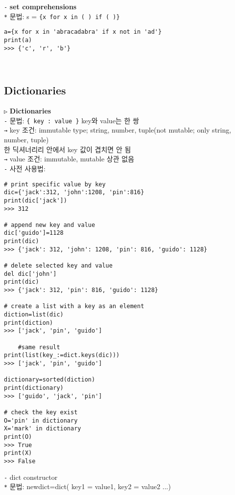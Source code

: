 \documentclass[11pt,a4paper]{article}
\begin{document}
\texttt{-} \textbf{set comprehensions}\\
\hspace*{2em}\texttt{*} 문법: s = \verb|{x for x in ( ) if ( )}|
\begin{lstlisting}[label={list:first}]
a={x for x in 'abracadabra' if x not in 'ad'}
print(a)
>>> {'c', 'r', 'b'}
\end{lstlisting}\\

\subsection{\Large\textbf{Dictionaries}}
\begin{spacing}{1.5}
\texttt{▷} \textbf{Dictionaries}\\
\texttt{-} 문법: \verb|{ key : value }| key와 value는 한 쌍\\
\hspace*{3em}\texttt{→} key 조건: immutable type; string, number, tuple(not mutable; only string, number, tuple)\\
\hspace*{5em}한 딕셔너리리 안에서 key 값이 겹치면 안 됨\\
\hspace*{3em}\texttt{→} value 조건: immutable, mutable 상관 없음\\
\texttt{-} 사전 사용법:
\end{spacing}
\begin{lstlisting}[label={list:first}]
# print specific value by key
dic={'jack':312, 'john':1208, 'pin':816}
print(dic['jack'])
>>> 312

# append new key and value
dic['guido']=1128
print(dic)
>>> {'jack': 312, 'john': 1208, 'pin': 816, 'guido': 1128}

# delete selected key and value
del dic['john']
print(dic)
>>> {'jack': 312, 'pin': 816, 'guido': 1128}

# create a list with a key as an element
diction=list(dic)
print(diction)
>>> ['jack', 'pin', 'guido']

    #same result
print(list(key_:=dict.keys(dic)))
>>> ['jack', 'pin', 'guido']

dictionary=sorted(diction)
print(dictionary)
>>> ['guido', 'jack', 'pin']

# check the key exist
O='pin' in dictionary
X='mark' in dictionary
print(O)
>>> True
print(X)
>>> False
\end{lstlisting}

\texttt{-} dict constructor\\
\hspace*{2em}\texttt{*} 문법: newdict=dict( key1 = value1, key2 = value2 ...)\\
\end{document}
